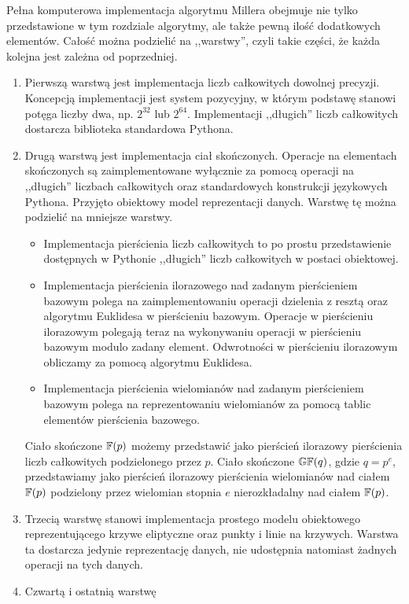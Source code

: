 Pełna komputerowa implementacja algorytmu Millera
obejmuje nie tylko przedstawione w tym rozdziale algorytmy,
ale także pewną ilość dodatkowych elementów.
Całość można podzielić na ,,warstwy'',
czyli takie części, że każda kolejna jest zależna od poprzedniej.
\begin{enumerate}
\item
Pierwszą warstwą jest implementacja liczb całkowitych dowolnej precyzji.
Koncepcją implementacji jest system pozycyjny,
w którym podstawę stanowi potęga liczby dwa, np. $2^{32}$ lub $2^{64}$.
Implementacji ,,długich'' liczb całkowitych
dostarcza biblioteka standardowa Pythona.
\item
Drugą warstwą jest implementacja ciał skończonych.
Operacje na elementach skończonych są zaimplementowane
wyłącznie za pomocą operacji na ,,długich'' liczbach całkowitych
oraz standardowych konstrukcji językowych Pythona.
Przyjęto obiektowy model reprezentacji danych.
Warstwę tę można podzielić na mniejsze warstwy.
\begin{itemize}
\item
Implementacja pierścienia liczb całkowitych to po prostu przedstawienie
dostępnych w Pythonie ,,długich'' liczb całkowitych w postaci obiektowej.
\item
Implementacja pierścienia ilorazowego nad zadanym pierścieniem bazowym
polega na zaimplementowaniu
operacji dzielenia z resztą oraz algorytmu Euklidesa w pierścieniu bazowym.
Operacje w pierścieniu ilorazowym polegają teraz
na wykonywaniu operacji w pierścieniu bazowym modulo zadany element.
Odwrotności w pierścieniu ilorazowym obliczamy
za pomocą algorytmu Euklidesa.
\item
Implementacja pierścienia wielomianów nad zadanym pierścieniem bazowym
polega na reprezentowaniu wielomianów
za pomocą tablic elementów pierścienia bazowego.
\end{itemize}
Ciało skończone $\mathbb{F}(p)$
możemy przedstawić jako pierścień ilorazowy
pierścienia liczb całkowitych podzielonego przez $p$.
Ciało skończone $\mathbb{GF}(q)$, gdzie $q = p^e$,
przedstawiamy jako pierścień ilorazowy
pierścienia wielomianów nad ciałem $\mathbb{F}(p)$
podzielony przez wielomian stopnia $e$
nierozkładalny nad ciałem $\mathbb{F}(p)$.
\item
Trzecią warstwę stanowi implementacja prostego modelu obiektowego
reprezentującego krzywe eliptyczne oraz punkty i linie na krzywych.
Warstwa ta dostarcza jedynie reprezentację danych,
nie udostępnia natomiast żadnych operacji na tych danych.
\item
Czwartą i ostatnią warstwę

\end{enumerate}
